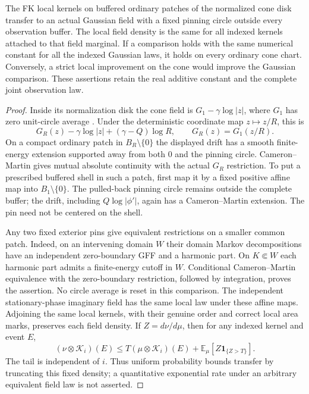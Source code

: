 \begin{lemma}
\label{comp:fk-reference-atlas}
The FK local kernels on buffered ordinary patches of the normalized
cone disk transfer to an actual Gaussian field with a fixed pinning
circle outside every observation buffer.  The local field density is
the same for all indexed kernels attached to that field marginal.
If a comparison holds with the same numerical constant for all the
indexed Gaussian laws, it holds on every ordinary cone chart.
Conversely, a strict local improvement on the cone would improve the
Gaussian comparison.  These assertions retain the real additive
constant and the complete joint observation law.
\end{lemma}
\begin{proof}
Inside its normalization disk the cone field is
$G_1-\gamma\log|z|$, where $G_1$ has zero unit-circle average
\cite[Definition~4.10 and the following discussion]{DMS}.
Under the deterministic coordinate map $z\mapsto z/R$, this is
\[
 G_R(z)-\gamma\log|z|+(\gamma-Q)\log R,
 \qquad G_R(z)=G_1(z/R).
\]
On a compact ordinary patch in $B_R\setminus\{0\}$ the displayed
drift has a smooth finite-energy extension supported away from both
$0$ and the pinning circle.  Cameron--Martin gives mutual absolute
continuity with the actual $G_R$ restriction.  To put a prescribed
buffered shell in such a patch, first map it by a fixed positive affine
map into $B_1\setminus\{0\}$.  The pulled-back pinning circle remains
outside the complete buffer; the drift, including $Q\log|\phi'|$,
again has a Cameron--Martin extension.  The pin need not be centered
on the shell.

Any two fixed exterior pins give equivalent restrictions on a smaller
common patch.  Indeed, on an intervening domain $W$ their domain
Markov decompositions have an independent zero-boundary GFF and a
harmonic part.  On $K\Subset W$ each harmonic part admits a
finite-energy cutoff in $W$.  Conditional Cameron--Martin equivalence
with the zero-boundary restriction, followed by integration, proves
the assertion.  No circle average is reset in this comparison.
The independent stationary-phase imaginary field has the same local
law under these affine maps.  Adjoining the same local kernels, with
their genuine order and correct local area marks, preserves each
field density.  If $Z=d\nu/d\mu$, then for any indexed kernel and
event $E$,
\[
 (\nu\otimes\mathcal K_i)(E)
 \le T(\mu\otimes\mathcal K_i)(E)
       +\mathbb E_\mu[Z\mathbf1_{\{Z>T\}}].
\]
The tail is independent of $i$.  Thus uniform probability bounds
transfer by truncating this fixed density; a quantitative exponential
rate under an arbitrary equivalent field law is not asserted.


\end{proof}
